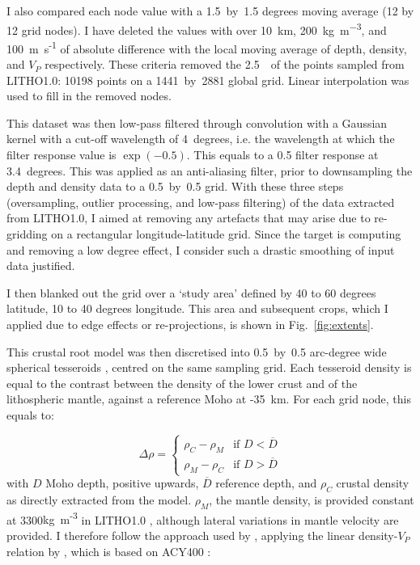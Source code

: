 I also compared each node value with a {1.5}~by~{1.5} degrees moving average (12 by 12 grid nodes). I have deleted the values with over 10~\si{\kilo \metre}, 200~\si{\kilo \gram \per \cubic \metre}, and 100~{m~s\textsuperscript{-1}} of absolute difference with the local moving average of depth, density, and $V_P$ respectively.
These criteria removed the {2.5}~\textperthousand~of the points sampled from {LITHO1.0}: 10198 points on a 1441~by~2881 global grid.
Linear interpolation was used to fill in the removed nodes.

This dataset was then low-pass filtered through convolution with a Gaussian kernel with a cut-off wavelength of 4~degrees, i.e. the wavelength at which the filter response value is $\exp(-0.5)$.
This equals to a {0.5} filter response at {3.4}~degrees.
This was applied as an anti-aliasing filter, prior to downsampling the depth and density data to a {0.5}~by~{0.5} grid.
With these three steps (oversampling, outlier processing, and low-pass filtering) of the data extracted from {LITHO1.0}, I aimed at removing any artefacts that may arise due to re-gridding on a rectangular longitude-latitude grid.
Since the target is computing and removing a low degree effect, I consider such a drastic smoothing of input data justified.

I then blanked out the grid over a `study area' defined by 40 to 60 degrees latitude, 10 to 40 degrees longitude.
This area and subsequent crops, which I applied due to edge effects or re-projections, is shown in Fig.~\ref{fig:extents}.

This crustal root model was then discretised into {0.5}~by~{0.5} arc-degree wide spherical tesseroids \parencite{Uieda2016}, centred on the same sampling grid.
Each tesseroid density is equal to the contrast between the density of the lower crust and of the lithospheric mantle, against a reference Moho at {-35}~\si{\kilo \metre}.
For each grid node, this equals to:

\begin{equation}
	\label{eq:RhoContrast}
	\Delta \rho = \begin{cases}
		\rho_{C} - \rho_{M} & \mbox{if } D < \overline{D} \\ 
	    \rho_{M} - \rho_{C} & \mbox{if } D > \overline{D}
    \end{cases}
\end{equation}
with $D$ Moho depth, positive upwards, $\overline{D}$ reference depth, and $\rho_{C}$ crustal density as directly extracted from the model.
$\rho_{M}$, the mantle density, is provided constant at 3300{kg~m\textsuperscript{-3}} in {LITHO1.0} \parencite{Pasyanos2014}, although lateral variations in mantle velocity are provided.
I therefore follow the approach used by \textcite{Sebera2018}, applying the linear density-$V_P$ relation by \textcite{Yegorova2015}, which is based on {ACY400} \parencite{Montagner1989}:

